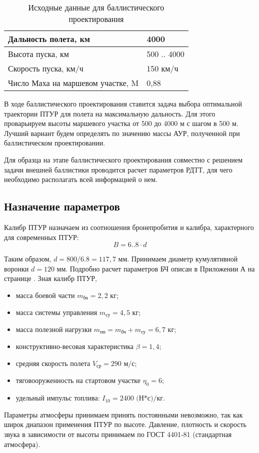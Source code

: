 \begin{table}[!h]
	\begin{center}
		\caption{Исходные данные для баллистического проектирования}
		\begin{tabular}{|l|l|}
  		\hline
Дальность полета, км & 4000 \\ \hline
Высота пуска, км & 500 .. 4000 \\ \hline
Скорость пуска, км/ч & 150 км/ч \\ \hline
Число Маха на маршевом участке, M & 0,88 \\ \hline
		\end{tabular}
		\label{tab:bal_proekt_nu}
	\end{center}
\end{table}

В ходе баллистического проектирования ставится задача выбора оптимальной траектории ПТУР для полета на максимальную дальность. Для этого проварьируем высоты маршевого участка от 500 до 4000 м с шагом в 500 м. Лучший вариант будем определять по значению массы АУР, полученной при баллистическом проектировании.

Для образца на этапе баллистического проектирования совместно с решением задачи внешней баллистики проводится расчет параметров РДТТ, для чего необходимо располагать всей информацией о нем.

\subsection{Назначение параметров}
Калибр ПТУР назначаем из соотношения бронепробития и калибра, характерного для современных ПТУР:
\[ B = 6..8 \cdot d \]

Таким образом, $d = 800/6.8 = 117,7 \text{ мм}$. Принимаем диаметр кумулятивной воронки $d = 120 \text{ мм}$. Подробно расчет параметров БЧ описан в Приложении А на странице \pageref{cha:appendix_bch}. Зная калибр ПТУР, 
\begin{itemize}
	\item масса боевой части $m_{\text{бч}} = 2,2 \text{ кг}$;
	\item масса системы управления $m_{\text{су}} = 4,5 \text{ кг}$;
	\item масса полезной нагрузки $m_{\text{пн}} = m_{\text{бч}} + m_{\text{су}} = 6,7 \text{ кг}$;
	\item конструктивно-весовая характеристика $\beta = 1,4$;
	\item средняя скорость полета $V_{\text{ср}} = 290 \text{ м/с}$;
	\item тяговооруженность на стартовом участке $\eta_0 = 6$;
	\item удельный импульс топлива:    $I_{10} = 2400 \text{ (Н*с)/кг}$.
\end{itemize}
Параметры атмосферы принимаем принять постоянными невозможно, так как широк диапазон применения ПТУР по высоте. Давление, плотность и скорость звука в зависимости от высоты принимаем по ГОСТ 4401-81 (стандартная атмосфера).

